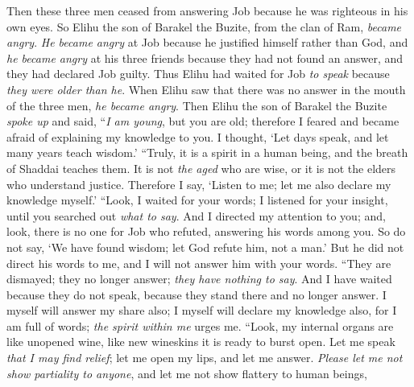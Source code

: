 \begin{biblechapter} %
 Then these three men ceased from answering Job because he was righteous in his own eyes.
\verse So Elihu the son of Barakel the Buzite, from the clan of Ram, \textit{became angry}. \textit{He became angry} at Job because he justified himself rather than God,
\verse and \textit{he became angry} at his three friends because they had not found an answer, and they had declared Job guilty.
\verse Thus Elihu had waited for Job \textit{to speak} because \textit{they were older than he}.
\verse When Elihu saw that there was no answer in the mouth of the three men, \textit{he became angry}.
\verse Then Elihu the son of Barakel the Buzite \textit{spoke up} and said,
\verse “\textit{I am young}, but you are old; 
therefore I feared and became afraid of explaining my knowledge to you.
\verse I thought, ‘Let days speak, 
and let many years teach wisdom.’
\verse “Truly, it is a spirit in a human being, 
and the breath of Shaddai teaches them.
\verse It is not \textit{the aged} who are wise, 
or it is not the elders who understand justice.
\verse Therefore I say, ‘Listen to me; 
let me also declare my knowledge myself.’
\verse “Look, I waited for your words; 
I listened for your insight, 
until you searched out \textit{what to say}.
\verse And I directed my attention to you; 
and, look, there is no one for Job who refuted, 
answering his words among you.
\verse So do not say, ‘We have found wisdom; 
let God refute him, not a man.’
\verse But he did not direct his words to me, 
and I will not answer him with your words.
\verse “They are dismayed; they no longer answer; 
\textit{they have nothing to say}.
\verse And I have waited because they do not speak, 
because they stand there and no longer answer.
\verse I myself will answer my share also; 
I myself will declare my knowledge also,
\verse for I am full of words; 
\textit{the spirit within me} urges me.
\verse “Look, my internal organs are like unopened wine, 
like new wineskins it is ready to burst open.
\verse Let me speak \textit{that I may find relief}; 
let me open my lips, and let me answer.
\verse \textit{Please let me not show partiality to anyone}, 
and let me not show flattery to human beings,
\end{biblechapter}

